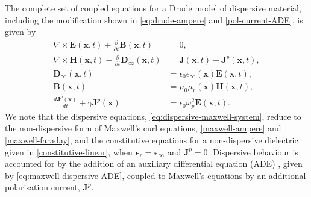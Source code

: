 The complete set of coupled equations for a Drude model of dispersive material, including the modification shown in \ref{eq:drude-ampere} and \ref{pol-current-ADE}, is given by
\begin{subequations}
    \label{eq:dispersive-maxwell-system}
    \begin{align}
        \nabla \times \mathbf{E}(\mathbf{x},t) + \frac{\partial }{\partial t} \mathbf{B}(\mathbf{x}, t) &= 0, \\
        \nabla \times \mathbf{H}(\mathbf{x},t) - \frac{\partial }{\partial t} \mathbf{D}_{\infty}(\mathbf{x}, t) &= \mathbf{J}(\mathbf{x},t) + \mathbf{J}^p(\mathbf{x},t), \\
        \mathbf{D}_{\infty}(\mathbf{x},t) &= \epsilon_0 \epsilon_{\infty}(\mathbf{x}) \mathbf{E}(\mathbf{x},t), \\
        \mathbf{B}(\mathbf{x},t) &= \mu_0 \mu_r(\mathbf{x}) \mathbf{H}(\mathbf{x},t), \\
        \frac{d \mathbf{J}^p(\mathbf{x})}{dt} + \gamma \mathbf{J}^p(\mathbf{x}) &= \epsilon_0 \omega_p^2 \mathbf{E}(\mathbf{x}, t) . \label{eq:maxwell-dispersive-ADE}
    \end{align}
\end{subequations}
%
We note that the dispersive equations, \ref{eq:dispersive-maxwell-system}, reduce to the non-dispersive form of Maxwell's curl equations, \ref{maxwell-ampere} and \ref{maxwell-faraday}, and the constitutive equations for a non-dispersive dielectric given in \ref{constitutive-linear}, when $\mathbf{\epsilon}_r = \mathbf{\epsilon}_{\infty}$ and $\mathbf{J}^p = 0$. Dispersive behaviour is accounted for by the addition of an auxiliary differential equation (ADE) \cite{Taflove:1989ds,Niegemann:2009uv,Ji:2007dl}, given by \ref{eq:maxwell-dispersive-ADE}, coupled to Maxwell's equations by an additional polarisation current, $\mathbf{J}^p$.

